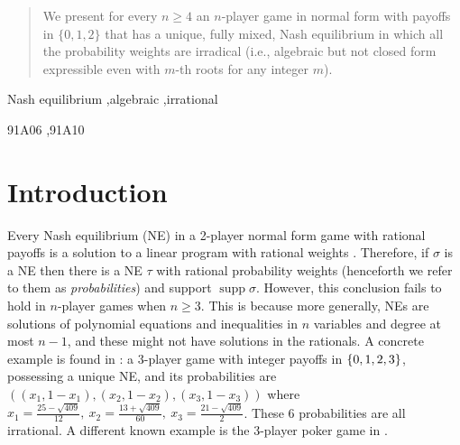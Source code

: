 \documentclass[preprint,12pt,authoryear]{elsarticle}
\DeclarePairedDelimiter{\ios}{\{}{\}}
\newcommand{\s}{\ios*}
\DeclareMathOperator*{\supp}{supp}
\begin{document}
\begin{frontmatter}


\begin{abstract}
    We present for every $n\ge4$ an $n$-player game in normal form with payoffs in $\{ 0, 1, 2\}$ that has a unique, fully mixed, Nash equilibrium in which all the probability weights are irradical (i.e., algebraic but not closed form expressible even with $m$-th roots for any integer $m$).
\end{abstract}


\begin{keyword}
    Nash equilibrium \sep algebraic \sep irrational

    \MSC[2020] 91A06 \sep 91A10
\end{keyword}

\end{frontmatter}

\section{Introduction}
Every Nash equilibrium (NE) in a 2-player normal form game with rational payoffs is a solution to a 
linear program with rational weights \citep{roughgarden2010algorithmic}. Therefore, if 
$\sigma$ is a NE then there is a NE $\tau$ with rational probability weights (henceforth we 
refer to them as \emph{probabilities}) and support $\supp\sigma$. However, this conclusion 
fails to hold in $n$-player games when $n\ge3$. This is because more generally, NEs are 
solutions of polynomial equations and inequalities in $n$ variables and degree at most $n-1$,
and these might not have solutions in the rationals. A concrete example is found in 
\citet{bilo2014complexity}: a $3$-player game with integer payoffs in $\s{0,1,2,3}$, 
possessing a unique NE, and its probabilities are $((x_1,1-x_1),(x_2,1-x_2),(x_3,1-x_3))$ 
where
$x_1=\frac{25-\sqrt{409}}{12},~x_2=\frac{13+\sqrt{409}}{60},~x_3=\frac{21-\sqrt{409}}{2}$.  
These 6 probabilities are all irrational. A different known example is the 3-player poker game in 
\citet{nash1950simple}.
\end{document}
